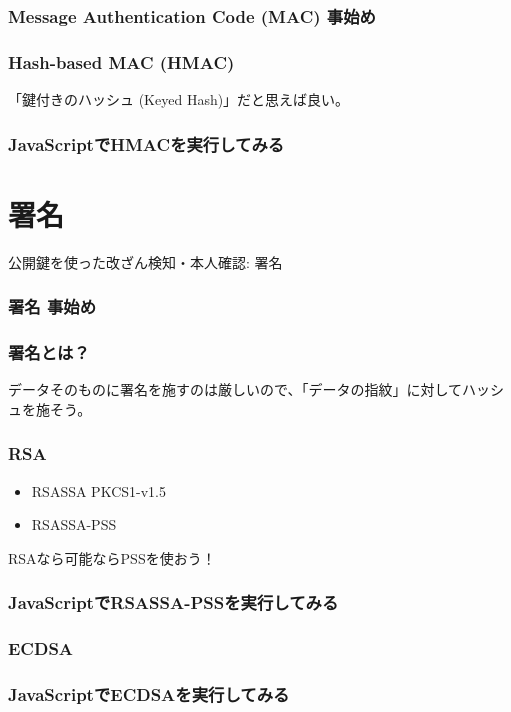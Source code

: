 \documentclass[12pt,dvipdfmx]{beamer}
\begin{document}
\begin{frame}
\frametitle{Message Authentication Code (MAC) 事始め}
\end{frame}

\begin{frame}
\frametitle{Hash-based MAC (HMAC)}
「鍵付きのハッシュ (Keyed Hash)」だと思えば良い。
\end{frame}

\begin{frame}
\frametitle{JavaScriptでHMACを実行してみる}
\end{frame}

\section{署名}
\begin{frame}
\centering
{\Large 公開鍵を使った改ざん検知・本人確認: 署名}

\end{frame}

\begin{frame}
\frametitle{署名 事始め}
\end{frame}

\begin{frame}
\frametitle{署名とは？}

データそのものに署名を施すのは厳しいので、「データの指紋」に対してハッシュを施そう。
\end{frame}


\begin{frame}
\frametitle{RSA}
\begin{itemize}
 \item RSASSA PKCS1-v1.5
 \item RSASSA-PSS
\end{itemize}

RSAなら可能ならPSSを使おう！
\end{frame}

\begin{frame}
\frametitle{JavaScriptでRSASSA-PSSを実行してみる}
\end{frame}

\begin{frame}
\frametitle{ECDSA}
\end{frame}

\begin{frame}
\frametitle{JavaScriptでECDSAを実行してみる}
\end{frame}
\end{document}
